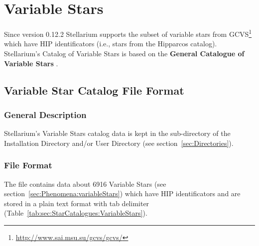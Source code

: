 \section{Variable Stars}
\label{sec:StarCatalogues:VariableStars}

Since version 0.12.2 Stellarium supports the subset of variable stars
from GCVS\footnote{\url{http://www.sai.msu.su/gcvs/gcvs/}} which have  HIP
identificators (i.e., stars from the Hipparcos catalog). Stellarium's Catalog
of Variable Stars is based on the
\textbf{General Catalogue of Variable Stars} \cite{samus}.

\subsection{Variable Star Catalog File Format}
\label{sec:StarCatalogues:VariableStars:format}

\subsubsection{General Description}%
\label{sec:StarCatalogues:VariableStars:general}

Stellarium's Variable Stars catalog data is kept
in the  sub-directory of the Installation Directory and/or
User Directory (see section~\ref{sec:Directories}).


\subsubsection{File Format}%
\label{sec:StarCatalogues:VariableStars:file}

The  file contains data about 6916 Variable Stars 
(see section~\ref{sec:Phenomena:variableStars}) which have HIP identificators and
are stored in a plain text format with tab delimiter (Table~\ref{tab:sec:StarCatalogues:VariableStars}).

